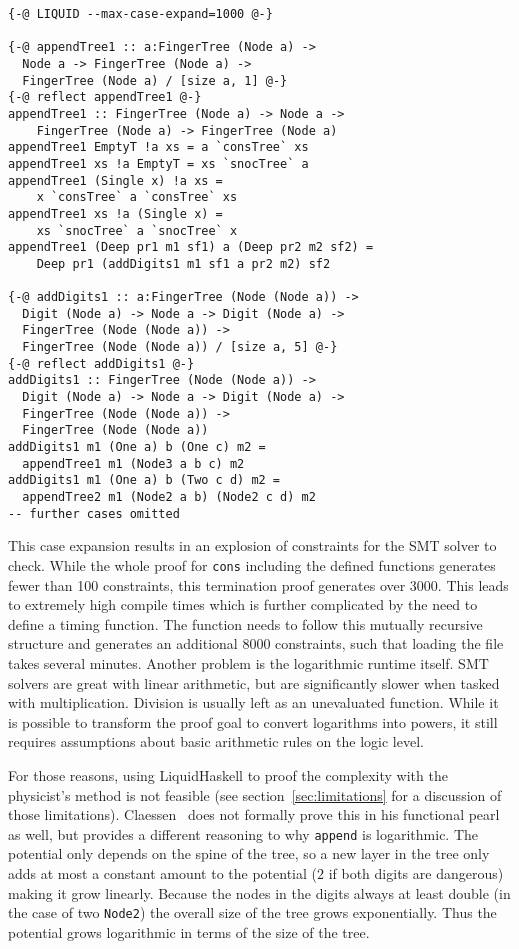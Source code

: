 \documentclass[sigplan,screen,review,anonymous]{acmart}
\begin{document}
\begin{lstlisting}
{-@ LIQUID --max-case-expand=1000 @-}

{-@ appendTree1 :: a:FingerTree (Node a) ->
  Node a -> FingerTree (Node a) ->
  FingerTree (Node a) / [size a, 1] @-}
{-@ reflect appendTree1 @-}
appendTree1 :: FingerTree (Node a) -> Node a ->
    FingerTree (Node a) -> FingerTree (Node a)
appendTree1 EmptyT !a xs = a `consTree` xs
appendTree1 xs !a EmptyT = xs `snocTree` a
appendTree1 (Single x) !a xs =
    x `consTree` a `consTree` xs
appendTree1 xs !a (Single x) =
    xs `snocTree` a `snocTree` x
appendTree1 (Deep pr1 m1 sf1) a (Deep pr2 m2 sf2) =
    Deep pr1 (addDigits1 m1 sf1 a pr2 m2) sf2

{-@ addDigits1 :: a:FingerTree (Node (Node a)) ->
  Digit (Node a) -> Node a -> Digit (Node a) ->
  FingerTree (Node (Node a)) ->
  FingerTree (Node (Node a)) / [size a, 5] @-}
{-@ reflect addDigits1 @-}
addDigits1 :: FingerTree (Node (Node a)) ->
  Digit (Node a) -> Node a -> Digit (Node a) ->
  FingerTree (Node (Node a)) ->
  FingerTree (Node (Node a))
addDigits1 m1 (One a) b (One c) m2 =
  appendTree1 m1 (Node3 a b c) m2
addDigits1 m1 (One a) b (Two c d) m2 =
  appendTree2 m1 (Node2 a b) (Node2 c d) m2
-- further cases omitted
\end{lstlisting}

This case expansion results in an explosion of constraints for the SMT solver to check. While the whole proof for \texttt{cons} including the defined functions generates fewer than 100 constraints, this termination proof generates over 3000. This leads to extremely high compile times which is further complicated by the need to define a timing function. The function needs to follow this mutually recursive structure and generates an additional 8000 constraints, such that loading the file takes several minutes. Another problem is the logarithmic runtime itself. SMT solvers are great with linear arithmetic, but are significantly slower when tasked with multiplication. Division is usually left as an unevaluated function. While it is possible to transform the proof goal to convert logarithms into powers, it still requires assumptions about basic arithmetic rules on the logic level.

For those reasons, using LiquidHaskell to proof the complexity with the physicist's method is not feasible (see section~\ref{sec:limitations} for a discussion of those limitations). Claessen~\cite{fingertrees_new} does not formally prove this in his functional pearl as well, but provides a different reasoning to why \texttt{append} is logarithmic. The potential only depends on the spine of the tree, so a new layer in the tree only adds at most a constant amount to the potential ($2$ if both digits are dangerous) making it grow linearly. Because the nodes in the digits always at least double (in the case of two \texttt{Node2}) the overall size of the tree grows exponentially. Thus the potential grows logarithmic in terms of the size of the tree.
\end{document}
